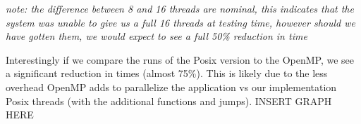 \textit{note: the difference between 8 and 16 threads are nominal, this indicates that the system was unable to give us a full 16 threads at testing time, however should we have gotten them, we would expect to see a full 50\% reduction in time}

Interestingly if we compare the runs of the Posix version to the OpenMP, we see a significant reduction in times (almost 75\%). 
This is likely due to the less overhead OpenMP adds to parallelize the application vs our implementation Posix threads (with the additional functions and jumps).
{INSERT GRAPH HERE}
